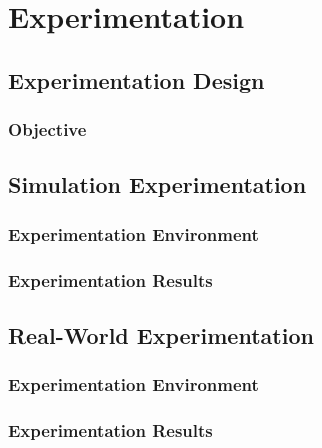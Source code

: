 \chapter{Experimentation}

\section{Experimentation Design}
\subsection{Objective}

\section{Simulation Experimentation}
\subsection{Experimentation Environment}


\subsection{Experimentation Results}

\section{Real-World Experimentation}
\subsection{Experimentation Environment}

\subsection{Experimentation Results}
